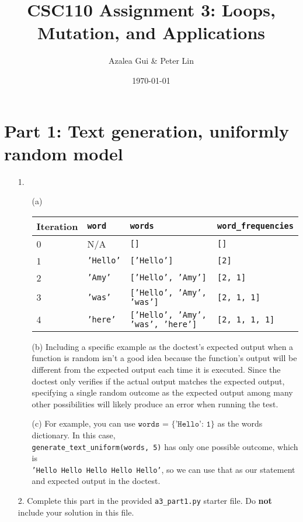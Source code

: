 \documentclass[fontsize=11pt]{article}
\title{CSC110 Assignment 3: Loops, Mutation, and Applications}
\author{Azalea Gui \& Peter Lin}
\date{\today}
\begin{document}
\maketitle

\section*{Part 1: Text generation, uniformly random model}

\begin{enumerate}

\item[1.]
\begin{enumerate}
    \item[(a)]
    \begin{tabular}{|l|l|l|l|}
    \hline
    Iteration & \verb|word| & \verb|words| & \verb|word_frequencies|\\
    \hline
    0 & N/A & \texttt{[]} & \texttt{[]} \\
    1 & \texttt{'Hello'} & \texttt{['Hello']} & \texttt{[2]} \\
    2 & \texttt{'Amy'} & \texttt{['Hello', 'Amy']} & \texttt{[2, 1]} \\
    3 & \texttt{'was'} & \texttt{['Hello', 'Amy', 'was']} & \texttt{[2, 1, 1]} \\
    4 & \texttt{'here'} & \texttt{['Hello', 'Amy', 'was', 'here']} & \texttt{[2, 1, 1, 1]} \\
    \hline
    \end{tabular}

    \item[(b)]
    Including a specific example as the doctest's expected output when a function is random isn't a good idea because the function's output will be different from the expected output each time it is executed. Since the doctest only verifies if the actual output matches the expected output, specifying a single random outcome as the expected output among many other possibilities will likely produce an error when running the test.

    \item[(c)]
    For example, you can use $\texttt{words = \{'Hello': 1\}}$ as the words dictionary. In this case,  \\
    \texttt{generate\_text\_uniform(words, 5)} has only one possible outcome, which is \\
    \texttt{'Hello Hello Hello Hello Hello'}, so we can use that as our statement and expected output in the doctest.
\end{enumerate}

\item[2.]
Complete this part in the provided \texttt{a3\_part1.py} starter file.
Do \textbf{not} include your solution in this file.

\end{enumerate}
\end{document}
